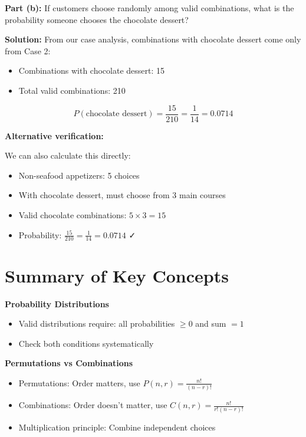 \documentclass[
  11pt,
]{article}
\begin{document}
\textbf{Part (b):} If customers choose randomly among valid
combinations, what is the probability someone chooses the chocolate
dessert?

\textbf{Solution:} From our case analysis, combinations with chocolate
dessert come only from Case 2:

\begin{itemize}
\item
  Combinations with chocolate dessert: 15
\item
  Total valid combinations: 210
\end{itemize}

\[P(\text{chocolate dessert}) = \frac{15}{210} = \frac{1}{14} = \boxed{0.0714}\]

\textbf{Alternative verification:}

We can also calculate this directly:

\begin{itemize}
\item
  Non-seafood appetizers: 5 choices
\item
  With chocolate dessert, must choose from 3 main courses
\item
  Valid chocolate combinations: \(5 \times 3 = 15\)
\item
  Probability: \(\frac{15}{210} = \frac{1}{14} = 0.0714\) ✓
\end{itemize}

\section{Summary of Key Concepts}\label{summary-of-key-concepts}

\textbf{Probability Distributions}

\begin{itemize}
\item
  Valid distributions require: all probabilities \(\geq 0\) and sum
  \(= 1\)
\item
  Check both conditions systematically
\end{itemize}

\textbf{Permutations vs Combinations}

\begin{itemize}
\item
  Permutations: Order matters, use \(P(n,r) = \frac{n!}{(n-r)!}\)
\item
  Combinations: Order doesn't matter, use
  \(C(n,r) = \frac{n!}{r!(n-r)!}\)
\item
  Multiplication principle: Combine independent choices
\end{itemize}
\end{document}

